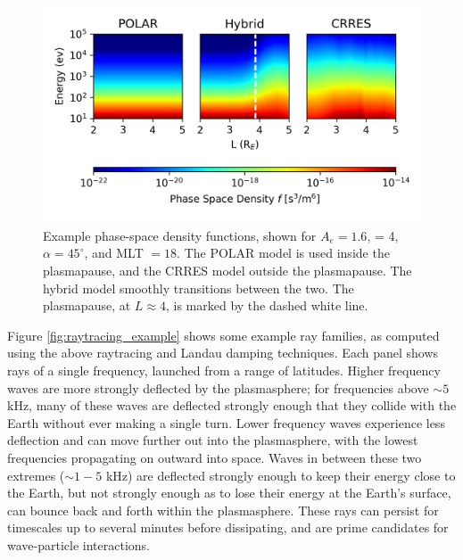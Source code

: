 \begin{figure}[ht]
\begin{center}
\includegraphics{Figures/psd.png}
\end{center}
\caption[Phase-space density functions]{Example phase-space density functions, shown for $A_e=1.6$, \kp{} = 4, $\alpha=45^\circ$, and MLT $=18$. The POLAR model is used inside the plasmapause, and the CRRES model outside the plasmapause. The hybrid model smoothly transitions between the two. The plasmapause, at $L\approx 4$, is marked by the dashed white line.}
\label{fig:phase_space_density}
\end{figure}

Figure \ref{fig:raytracing_example} shows some example ray families, as computed using the above raytracing and Landau damping techniques. Each panel shows rays of a single frequency, launched from a range of latitudes. Higher frequency waves are more strongly deflected by the plasmasphere; for frequencies above $\sim 5$ kHz, many of these waves are deflected strongly enough that they collide with the Earth without ever making a single turn. Lower frequency waves experience less deflection and can move further out into the plasmasphere, with the lowest frequencies propagating on outward into space. Waves in between these two extremes ($\sim 1-5$ kHz) are deflected strongly enough to keep their energy close to the Earth, but not strongly enough as to lose their energy at the Earth's surface, can bounce back and forth within the plasmasphere. These rays can persist for timescales up to several minutes before dissipating, and are prime candidates for wave-particle interactions.



